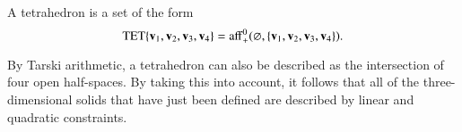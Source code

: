 %

\begin{definition}[tetrahedron]
 A tetrahedron is a set of the form
\begin{displaymath}{\operatorname{TET}}\{{\mathbf v}_1,{\mathbf v}_2,{\mathbf v}_3,{\mathbf v}_4\} = 
{\operatorname{aff}}^0_+(\varnothing,\{{\mathbf v}_1,{\mathbf v}_2,{\mathbf v}_3,{\mathbf v}_4\}).\end{displaymath}
%
\end{definition}

\begin{remark}
  By Tarski arithmetic, %
  a tetrahedron can also be described as the intersection of four open
  half-spaces.  By taking this into account, it follows that all of
  the three-dimensional solids that have just been defined are
  described by linear and quadratic constraints.  %
\end{remark}

%

